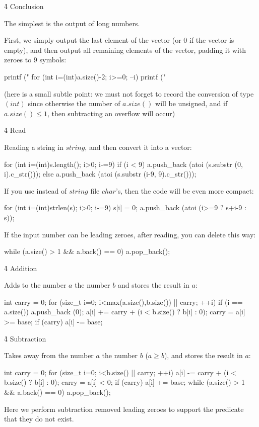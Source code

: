 \h4{ Conclusion }

The simplest is the output of long numbers.

First, we simply output the last element of the vector (or $0$ if the vector is empty), and then output all remaining elements of the vector, padding it with zeroes to $9$ symbols:

\code
printf ("%
for (int i=(int)a.size()-2; i>=0; --i)
printf ("%
\endcode

(here is a small subtle point: we must not forget to record the conversion of type $(int)$ since otherwise the number of $a.size()$ will be unsigned, and if $a.size() \le 1$, then subtracting an overflow will occur)


\h4{ Read }

Reading a string in $string$, and then convert it into a vector:

\code
for (int i=(int)s.length(); i>0; i-=9)
if (i < 9)
a.push_back (atoi (s.substr (0, i).c_str()));
else
a.push_back (atoi (s.substr (i-9, 9).c_str()));
\endcode

If you use instead of $string$ file $char$'s, then the code will be even more compact:

\code
for (int i=(int)strlen(s); i>0; i-=9) {
s[i] = 0;
a.push_back (atoi (i>=9 ? s+i-9 : s));
}
\endcode

If the input number can be leading zeroes, after reading, you can delete this way:

\code
while (a.size() > 1 && a.back() == 0)
a.pop_back();
\endcode


\h4{ Addition }

Adds to the number $a$ the number $b$ and stores the result in $a$:

\code
int carry = 0;
for (size_t i=0; i<max(a.size(),b.size()) || carry; ++i) {
if (i == a.size())
a.push_back (0);
a[i] += carry + (i < b.size() ? b[i] : 0);
carry = a[i] >= base;
if (carry) a[i] -= base;
}
\endcode


\h4{ Subtraction }

Takes away from the number $a$ the number $b$ ($a \ge b$), and stores the result in $a$:

\code
int carry = 0;
for (size_t i=0; i<b.size() || carry; ++i) {
a[i] -= carry + (i < b.size() ? b[i] : 0);
carry = a[i] < 0;
if (carry) a[i] += base;
}
while (a.size() > 1 && a.back() == 0)
a.pop_back();
\endcode

Here we perform subtraction removed leading zeroes to support the predicate that they do not exist.


